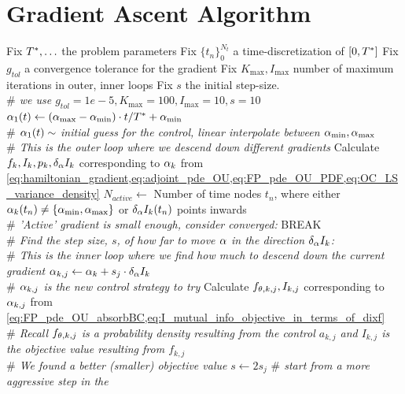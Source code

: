\documentclass{article}
\begin{document}
\section{Gradient Ascent Algorithm}
\begin{algorithm}
\begin{algorithmic}
\State Fix ${ T^* }, \ldots$ the problem parameters
\State Fix $\{t_n\}_0^{N_t}$ a time-discretization of $[0,{ T^* }]$
\State Fix $g_{tol}$ a convergence tolerance for the gradient
\State Fix $K_{\max}, I_{\max}$ number of maximum iterations in outer, inner
loops
\State Fix $s$ the initial step-size. 
\\ {\itshape $\#$ we use $g_{tol}=1e-5,K_{\max}=100,I_{\max}=10,s=10$}
\State ${\alpha}_1(t) \gets ({ {\alpha}_{\textrm{max}} }-{ {\alpha}_{\textrm{min}} }) \cdot t / { T^* } + { {\alpha}_{\textrm{min}} }$ 
\\{\itshape  $\#$ ${\alpha}_1(t) \sim$ initial guess for the control, linear
interpolate between ${ {\alpha}_{\textrm{min}} }, { {\alpha}_{\textrm{max}} }$}
\\ {\itshape $\#$ This is the outer loop where we descend down different
gradients}
 \State Calculate $f_k,I_{k},p_k, \delta_{\alpha} I_k$ corresponding to
	${\alpha}_k$ from
	\cref{eq:hamiltonian_gradient,eq:adjoint_pde_OU,eq:FP_pde_OU_PDF,eq:OC_LS_variance_density}
	\State $N_{active}\gets$   Number of time nodes $t_n$, where either
	${\alpha}_k(t_n) \neq \{{ {\alpha}_{\textrm{min}} }, { {\alpha}_{\textrm{max}} }\}$ or $\delta_{\alpha} I_k(t_n)$ points inwards
		  \\ {\itshape  $\#$ 'Active' gradient is small enough,
		 consider converged:}
		 \State BREAK
	\EndIf
	\\ {\itshape $\#$ Find the step size, $s$, of how far to move ${\alpha}$ in the
	direction $\delta_{\alpha} I_k$:}
	\\ {\itshape $\#$ This is the inner loop where we find how much to descend down
	the current gradient}
	\State ${\alpha}_{k,j} \gets {\alpha}_{k} + s_j \cdot \delta_{\alpha} I_k  $
	\\ {\itshape $\#$ ${\alpha}_{k,j}$ is the new control strategy to try}
	\State Calculate $f_{{\theta},k,j}, I_{k,j}$ corresponding to
		${\alpha}_{k,j}$ from
		\cref{eq:FP_pde_OU_absorbBC,eq:I_mutual_info_objective_in_terms_of_dixf} \\
		{\itshape $\#$ Recall $f_{{\theta},k,j}$ is a probability density resulting from
		the control $a_{k,j}$ and $I_{k,j}$ is the objective value resulting from $f_{k,j}$}  
		\\ {\itshape $\#$ We found a better (smaller) objective value}
		\State $s \gets 2 s_j$ {\itshape $\#$ start from a more aggressive step in the
}
\end{algorithmic}
\end{algorithm}
\end{document}
